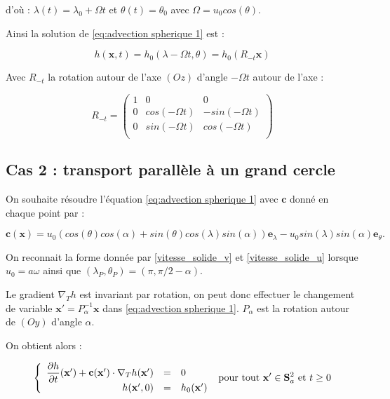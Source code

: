 d'où : $\lambda(t) = \lambda_0 + \Omega t$ et $\theta(t) = \theta_0$ avec $\Omega = u_0 cos ( \theta )$.

Ainsi la solution de \eqref{eq:advection spherique 1} est :

\begin{equation}
\label{eq: advection solution 1}
h( \mathbf{x}, t ) = h_0 ( \lambda - \Omega t, \theta ) = h_0 ( R_{-t}  \mathbf{x} )
\end{equation}

Avec $R_{-t}$ la rotation autour de l'axe $(Oz)$ d'angle $-\Omega t$ autour de l'axe :

\begin{equation}
\label{rotation}
R_{-t} = \begin{pmatrix}
1 & 0 & 0 \\
0 & cos \left( - \Omega t \right) & -sin \left( - \Omega t \right)\\
0 & sin \left( - \Omega t \right) & cos \left( - \Omega t \right)\\
\end{pmatrix}
\end{equation}

\subsection{Cas 2 : transport parallèle à un grand cercle}

On souhaite résoudre l'équation \eqref{eq:advection spherique 1} avec $\mathbf{c}$ donné en chaque point par :

$$\mathbf{c} ( \mathbf{x} ) = u_0 ( cos ( \theta) cos ( \alpha ) + sin( \theta) cos ( \lambda) sin( \alpha) ) \mathbf{e}_{\lambda} - u_0 sin( \lambda) sin( \alpha) \mathbf{e}_{\theta}. $$

On reconnait la forme donnée par \eqref{vitesse_solide_v} et \eqref{vitesse_solide_u} lorsque $u_0 = a \omega$ ainsi que $(\lambda_P, \theta_P) = (\pi, \pi/2 - \alpha)$. 

Le gradient $\nabla_T h$ est invariant par rotation, on peut donc effectuer le changement de variable $\mathbf{x}' = P_{\alpha}^{-1} \mathbf{x}$ dans \eqref{eq:advection spherique 1}. $P_{\alpha}$ est la rotation autour de $(Oy)$ d'angle $\alpha$.

On obtient alors :

\begin{equation}
\left\lbrace
\begin{array}{r cl}
\dfrac{\partial h}{\partial t}( \mathbf{x}' ) + \mathbf{c} ( \mathbf{x}' ) \cdot \nabla_ T h( \mathbf{x}' ) & = & 0 \\
h(\mathbf{x}',0) & = & h_0 ( \mathbf{x}' )
\end{array}
\right. \text{ pour tout } \mathbf{x}' \in \mathbf{S}_a^2 \text{ et } t \geq 0
\end{equation}

